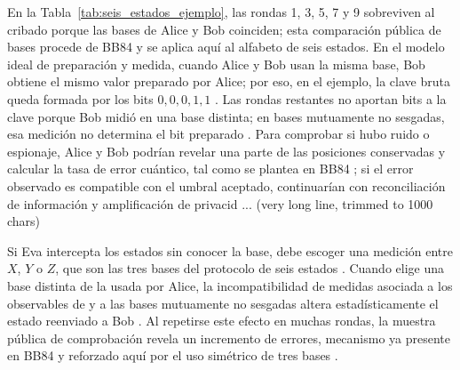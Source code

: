 En la Tabla~\ref{tab:seis_estados_ejemplo}, las rondas 1, 3, 5, 7 y 9 sobreviven al cribado porque las bases de Alice y Bob coinciden; esta comparación pública de bases procede de BB84 y se aplica aquí al alfabeto de seis estados. En el modelo ideal de preparación y medida, cuando Alice y Bob usan la misma base, Bob obtiene el mismo valor preparado por Alice; por eso, en el ejemplo, la clave bruta queda formada por los bits $0,0,0,1,1$ \citep{bennett1984,bruss1998}. Las rondas restantes no aportan bits a la clave porque Bob midió en una base distinta; en bases mutuamente no sesgadas, esa medición no determina el bit preparado \citep{schwinger1960}. Para comprobar si hubo ruido o espionaje, Alice y Bob podrían revelar una parte de las posiciones conservadas y calcular la tasa de error cuántico, tal como se plantea en BB84 \citep{bennett1984}; si el error observado es compatible con el umbral aceptado, continuarían con reconciliación de información y amplificación de privacid ... (very long line, trimmed to 1000 chars)

Si Eva intercepta los estados sin conocer la base, debe escoger una medición entre $X$, $Y$ o $Z$, que son las tres bases del protocolo de seis estados \citep{bruss1998}. Cuando elige una base distinta de la usada por Alice, la incompatibilidad de medidas asociada a los observables de \cite{pauli1927} y a las bases mutuamente no sesgadas altera estadísticamente el estado reenviado a Bob \citep{schwinger1960}. Al repetirse este efecto en muchas rondas, la muestra pública de comprobación revela un incremento de errores, mecanismo ya presente en BB84 y reforzado aquí por el uso simétrico de tres bases \citep{bennett1984,bruss1998}.
